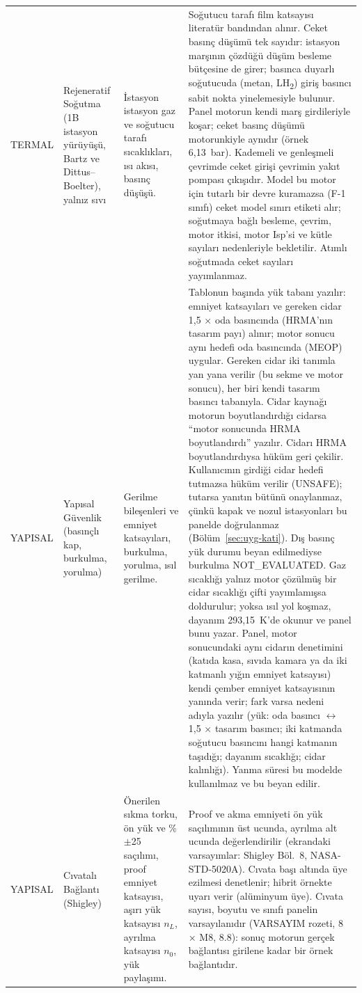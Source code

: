 \documentclass[11pt,a4paper]{article}
\newcommand{\ui}[1]{\textsf{#1}}
\begin{document}
\begin{longtable}{@{}>{\raggedright\arraybackslash}p{3.2cm}>{\raggedright\arraybackslash}p{3.6cm}>{\raggedright\arraybackslash}p{4.2cm}>{\raggedright\arraybackslash}p{4.6cm}@{}}
\ui{TERMAL} & Rejeneratif Soğutma (1B istasyon yürüyüşü, Bartz ve Dittus--Boelter), yalnız sıvı & İstasyon istasyon gaz ve soğutucu tarafı sıcaklıkları, ısı akısı, basınç düşüşü. & Soğutucu tarafı film katsayısı literatür bandından alınır. Ceket basınç düşümü tek sayıdır: istasyon marşının çözdüğü düşüm besleme bütçesine de girer; basınca duyarlı soğutucuda (metan, LH\textsubscript{2}) giriş basıncı sabit nokta yinelemesiyle bulunur. Panel motorun kendi marş girdileriyle koşar; ceket basınç düşümü motorunkiyle aynıdır (örnek 6,13~bar). Kademeli ve genleşmeli çevrimde ceket girişi çevrimin yakıt pompası çıkışıdır. Model bu motor için tutarlı bir devre kuramazsa (F-1 sınıfı) ceket \ui{model sınırı} etiketi alır; soğutmaya bağlı besleme, çevrim, motor itkisi, motor Isp'si ve kütle sayıları nedenleriyle bekletilir. Atımlı soğutmada ceket sayıları yayımlanmaz. \\
\ui{YAPISAL} & Yapısal Güvenlik (basınçlı kap, burkulma, yorulma) & Gerilme bileşenleri ve emniyet katsayıları, burkulma, yorulma, ısıl gerilme. & Tablonun başında yük tabanı yazılır: emniyet katsayıları ve gereken cidar 1,5 × oda basıncında (HRMA'nın tasarım payı) alınır; motor sonucu aynı hedefi oda basıncında (MEOP) uygular. Gereken cidar iki tanımla yan yana verilir (bu sekme ve motor sonucu), her biri kendi tasarım basıncı tabanıyla. Cidar kaynağı motorun boyutlandırdığı cidarsa ``motor sonucunda HRMA boyutlandırdı'' yazılır. Cidarı HRMA boyutlandırdıysa hüküm geri çekilir. Kullanıcının girdiği cidar hedefi tutmazsa hüküm verilir (\ui{UNSAFE}); tutarsa yanıtın bütünü onaylanmaz, çünkü kapak ve nozul istasyonları bu panelde doğrulanmaz (Bölüm~\ref{sec:uyg-kati}). Dış basınç yük durumu beyan edilmediyse burkulma \ui{NOT\_EVALUATED}. Gaz sıcaklığı yalnız motor çözülmüş bir cidar sıcaklığı çifti yayımlamışsa doldurulur; yoksa ısıl yol koşmaz, dayanım 293,15~K'de okunur ve panel bunu yazar. Panel, motor sonucundaki aynı cidarın denetimini (katıda kasa, sıvıda kamara ya da iki katmanlı yığın emniyet katsayısı) kendi çember emniyet katsayısının yanında verir; fark varsa nedeni adıyla yazılır (yük: oda basıncı $\leftrightarrow$ 1,5 × tasarım basıncı; iki katmanda soğutucu basıncını hangi katmanın taşıdığı; dayanım sıcaklığı; cidar kalınlığı). Yanma süresi bu modelde kullanılmaz ve bu beyan edilir. \\
\ui{YAPISAL} & Cıvatalı Bağlantı (Shigley) & Önerilen sıkma torku, ön yük ve \%$\pm$25 saçılımı, proof emniyet katsayısı, aşırı yük katsayısı $n_L$, ayrılma katsayısı $n_0$, yük paylaşımı. & Proof ve akma emniyeti ön yük saçılımının üst ucunda, ayrılma alt ucunda değerlendirilir (ekrandaki varsayımlar: Shigley Böl.~8, NASA-STD-5020A). Cıvata başı altında üye ezilmesi denetlenir; hibrit örnekte uyarı verir (alüminyum üye). Cıvata sayısı, boyutu ve sınıfı panelin varsayılanıdır (\ui{VARSAYIM} rozeti, 8 × M8, 8.8): sonuç motorun gerçek bağlantısı girilene kadar bir örnek bağlantıdır. \\

\end{longtable}
\end{document}
